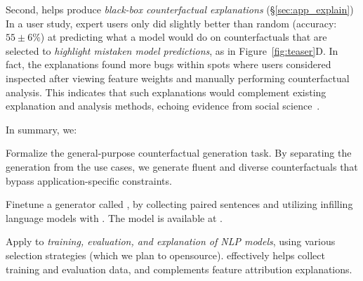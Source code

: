 Second, \sysname helps produce \emph{black-box counterfactual explanations} (\S\ref{sec:app_explain})
In a user study, expert users only did slightly better than random (accuracy: $55 \pm 6\%$) at predicting what a model would do on \sysname counterfactuals that are selected to \emph{highlight mistaken model predictions}, as in Figure~\ref{fig:teaser}D.
In fact, the explanations found more bugs within spots where users considered inspected after viewing feature weights and manually performing counterfactual analysis.
This indicates that such explanations would complement existing explanation and analysis methods, echoing evidence from social science~\cite{miller}.


In summary, we:
\begin{compactenum}
\item  Formalize the general-purpose counterfactual generation task. 
By separating the generation from the use cases, we generate fluent and diverse counterfactuals that bypass application-specific constraints.
\item Finetune a generator called \sysname, by collecting paired sentences and utilizing infilling language models with \tagstrs. 
The model is available at \modelurl.
\item Apply \sysname to \emph{training, evaluation, and explanation of NLP models}, using various selection strategies (which we plan to opensource).
\sysname effectively helps collect training and evaluation data, and complements feature attribution explanations.
\end{compactenum}


